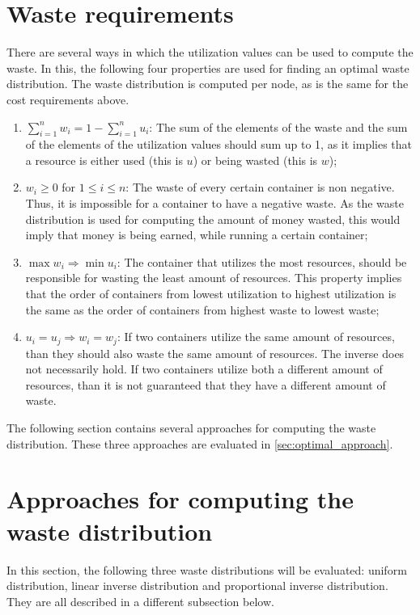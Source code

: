 \section{Waste requirements} \label{sec:waste_requirements}
There are several ways in which the utilization values can be used to compute the waste. In this, the following four properties are used for finding an optimal waste distribution. The waste distribution is computed per node, as is the same for the cost requirements above.
\begin{enumerate}
    \item \textbf{$\sum_{i=1}^n w_i = 1 - \sum_{i=1}^n u_i $}: The sum of the elements of the waste and the sum of the elements of the utilization values should sum up to 1, as it implies that a resource is either used (this is $u$) or being wasted (this is $w$);
    \item \textbf{$w_i \geq 0$} for $1 \leq i \leq n$: The waste of every certain container is non negative. Thus, it is impossible for a container to have a negative waste. As the waste distribution is used for computing the amount of money wasted, this would imply that money is being earned, while running a certain container;
    \item \textbf{$\max w_i \Rightarrow \min u_i$}: The container that utilizes the most resources, should be responsible for wasting the least amount of resources. This property implies that the order of containers from lowest utilization to highest utilization is the same as the order of containers from highest waste to lowest waste;
    \item \textbf{$u_i = u_j \Rightarrow w_i = w_j $}: If two containers utilize the same amount of resources, than they should also waste the same amount of resources. The inverse does not necessarily hold. If two containers utilize both a different amount of resources, than it is not guaranteed that they have a different amount of waste.
\end{enumerate}

\noindent
The following section contains several approaches for computing the waste distribution. These three approaches are evaluated in \autoref{sec:optimal_approach}.

\section{Approaches for computing the waste distribution} \label{sec:approaches}
In this section, the following three waste distributions will be evaluated: uniform distribution, linear inverse distribution and proportional inverse distribution. They are all described in a different subsection below.

